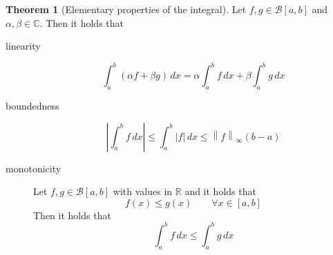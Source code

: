 \documentclass[a4paper,landscape,twocolumn]{article}
\theoremstyle{definition}
\newtheorem{theorem}{Theorem}
\newcommand\abs[1]{\left|#1\right|}
\newcommand\reg{\mathcal B}
\newcommand\norm[1]{\left\|#1\right\|}
\begin{document}
\begin{theorem}[Elementary properties of the integral]
  Let $f,g \in \reg[a,b]$ and $\alpha,\beta \in \mathbb C$.
  Then it holds that
  \begin{description}
    \item[linearity]
      \[ \int_a^b (\alpha f + \beta g) \, dx = \alpha \int_a^b f \, dx + \beta \int_a^b g\, dx \]
    \item[boundedness]
      \[ \abs{\int_a^b f \, dx} \leq \int_a^b \abs{f} \, dx \leq \norm{f}_\infty (b - a) \]
    \item[monotonicity]
      Let $f,g \in \reg[a,b]$ with values in $\mathbb R$ and it holds that
      \[ f(x) \leq g(x) \qquad \forall x \in [a,b] \]
      Then it holds that
      \[ \int_a^b f\, dx \leq \int_a^b g \, dx \]
  \end{description}
\end{theorem}
\end{document}

